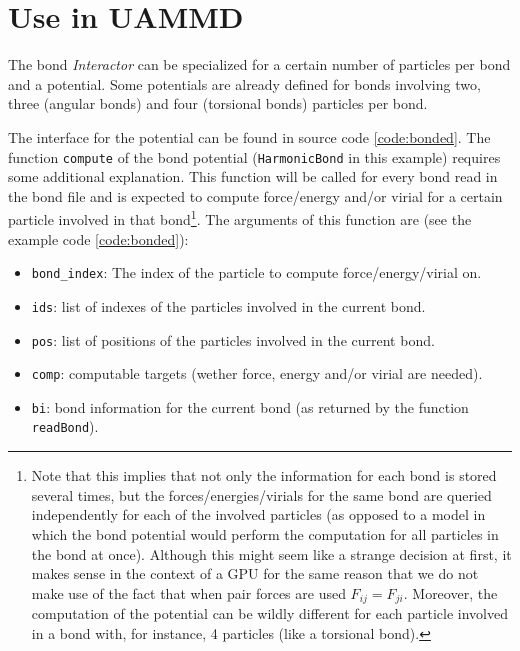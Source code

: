 \documentclass[ twoside,openright,titlepage,numbers=noenddot,%
headinclude,footinclude,cleardoublepage=empty,abstract=on,
BCOR=5mm,paper=b5,fontsize=11pt, dvipsnames
]{scrreprt}
\def\ucpp{uammd_cpp_lexer.py:UAMMDCppLexer -x}
\begin{document}
\section*{Use in UAMMD}
The bond \emph{Interactor} can be specialized for a certain number of particles per bond and a potential. Some potentials are already defined for bonds involving two, three (angular bonds) and four (torsional bonds) particles per bond.

The interface for the potential can be found in source code \ref{code:bonded}. The function \texttt{compute} of the bond potential (\texttt{HarmonicBond} in this example) requires some additional explanation. This function will be called for every bond read in the bond file and is expected to compute force/energy and/or virial for a certain particle involved in that bond\footnote{Note that this implies that not only the information for each bond is stored several times, but the forces/energies/virials for the same bond are queried independently for each of the involved particles (as opposed to a model in which the bond potential would perform the computation for all particles in the bond at once). Although this might seem like a strange decision at first, it makes sense in the context of a GPU for the same reason that we do not make use of the fact that when pair forces are used $F_{ij} = F_{ji}$. Moreover, the computation of the potential can be wildly different for each particle involved in a bond with, for instance, 4 particles (like a torsional bond).}. The arguments of this function are (see the example code \ref{code:bonded}):
\begin{itemize}
\item \texttt{bond_index}: The index of the particle to compute force/energy/virial on.
\item \texttt{ids}: list of indexes of the particles involved in the current bond.
\item \texttt{pos}: list of positions of the particles involved in the current bond.
\item \texttt{comp}: computable targets (wether force, energy and/or virial are needed).
\item \texttt{bi}: bond information for the current bond (as returned by the function \texttt{readBond}).
\end{itemize}
\end{document}
